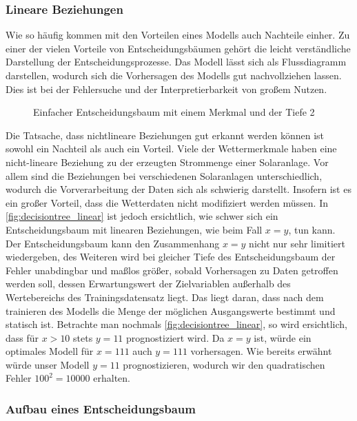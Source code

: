 \documentclass[12pt, a4paper]{article}
\begin{document}

\subsubsection{Lineare Beziehungen}

Wie so häufig kommen mit den Vorteilen eines Modells auch Nachteile einher. Zu einer der vielen Vorteile von Entscheidungsbäumen gehört die leicht verständliche Darstellung der Entscheidungsprozesse. Das Modell lässt sich als Flussdiagramm darstellen, wodurch sich die Vorhersagen des Modells gut nachvollziehen lassen. Dies ist bei der Fehlersuche und der Interpretierbarkeit von großem Nutzen.

\begin{figure}
\centering
\def\svgwidth{350pt}

\caption{Einfacher Entscheidungsbaum mit einem Merkmal und der Tiefe 2}
\label{fig:decisiontree_linear}
\end {figure}

Die Tatsache, dass nichtlineare Beziehungen gut erkannt werden können ist sowohl ein Nachteil als auch ein Vorteil. Viele der Wettermerkmale haben eine nicht-lineare Beziehung zu der erzeugten Strommenge einer Solaranlage. Vor allem sind die Beziehungen bei verschiedenen Solaranlagen unterschiedlich, wodurch die Vorverarbeitung der Daten sich als schwierig darstellt. Insofern ist es ein großer Vorteil, dass die Wetterdaten nicht modifiziert werden müssen. In \autoref{fig:decisiontree_linear} ist jedoch ersichtlich, wie schwer sich ein Entscheidungsbaum mit linearen Beziehungen, wie beim Fall $x=y$, tun kann. Der Entscheidungsbaum kann den Zusammenhang $x=y$ nicht nur sehr limitiert wiedergeben, des Weiteren wird bei gleicher Tiefe des Entscheidungsbaum der Fehler  unabdingbar und maßlos größer, sobald Vorhersagen zu Daten getroffen werden soll, dessen Erwartungswert der Zielvariablen außerhalb des Wertebereichs des Trainingsdatensatz liegt. Das liegt daran, dass nach dem trainieren des Modells die Menge der möglichen Ausgangswerte bestimmt und statisch ist. Betrachte man nochmals \autoref{fig:decisiontree_linear}, so wird ersichtlich, dass für $x>10$ stets $y=11$ prognostiziert wird. Da $x=y$ ist, würde ein optimales Modell für $x=111$ auch $y=111$ vorhersagen. Wie bereits erwähnt würde unser Modell $y=11$ prognostizieren, wodurch wir den quadratischen Fehler $100^{2}=10000$ erhalten. 

\subsubsection{Aufbau eines Entscheidungsbaum}
\end{document}
